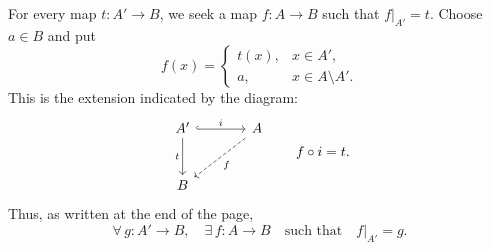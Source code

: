 \medskip
\noindent For every map $t:A'\longrightarrow B$, we seek a map
$f:A\longrightarrow B$ such that $f|_{A'}=t$.
Choose $a\in B$ and put
\[
 f(x)=
 \begin{cases}
   t(x),&x\in A',\\
   a,&x\in A\setminus A'.
 \end{cases}
\]
This is the extension indicated by the diagram:
\[
\begin{tikzcd}[column sep=large,row sep=large]
 A'\arrow[r,hook,"i"]\arrow[d,"t"']
    & A\arrow[dl,dashed,"f"]\\
 B &
\end{tikzcd}
\qquad f\circ i=t.
\]
Thus, as written at the end of the page,
\[
 \forall\,g:A'\longrightarrow B,\quad
 \exists\,f:A\longrightarrow B
 \quad\text{such that}\quad f|_{A'}=g.
\]

\endgroup
